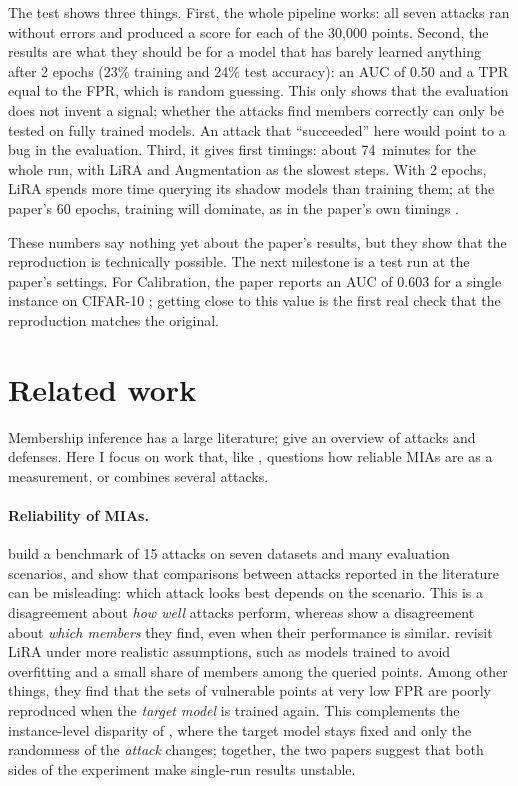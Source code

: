 \documentclass[a4paper]{article}
\begin{document}
The test shows three things.
First, the whole pipeline works: all seven attacks ran without errors and produced a score for each of the 30{,}000 points.
Second, the results are what they should be for a model that has barely learned anything after 2 epochs (23\% training and 24\% test accuracy): an AUC of 0.50 and a TPR equal to the FPR, which is random guessing. This only shows that the evaluation does not invent a signal; whether the attacks find members correctly can only be tested on fully trained models.
An attack that ``succeeded'' here would point to a bug in the evaluation.
Third, it gives first timings: about 74~minutes for the whole run, with LiRA and Augmentation as the slowest steps.
With 2 epochs, LiRA spends more time querying its shadow models than training them; at the paper's 60 epochs, training will dominate, as in the paper's own timings \citep[extended version, App.~C.1]{wang2025mia}.

These numbers say nothing yet about the paper's results, but they show that the reproduction is technically possible.
The next milestone is a test run at the paper's settings.
For Calibration, the paper reports an AUC of 0.603 for a single instance on CIFAR-10 \citep[Table~1]{wang2025mia}; getting close to this value is the first real check that the reproduction matches the original.

\section{Related work}
\label{sec:relwork}

Membership inference has a large literature; \citet{hu2022survey} give an overview of attacks and defenses.
Here I focus on work that, like \citet{wang2025mia}, questions how reliable MIAs are as a measurement, or combines several attacks.

\paragraph{Reliability of MIAs.}
\citet{niu2025comparing} build a benchmark of 15 attacks on seven datasets and many evaluation scenarios, and show that comparisons between attacks reported in the literature can be misleading: which attack looks best depends on the scenario.
This is a disagreement about \emph{how well} attacks perform, whereas \citet{wang2025mia} show a disagreement about \emph{which members} they find, even when their performance is similar.
\citet{jebreel2026revisiting} revisit LiRA under more realistic assumptions, such as models trained to avoid overfitting and a small share of members among the queried points.
Among other things, they find that the sets of vulnerable points at very low FPR are poorly reproduced when the \emph{target model} is trained again.
This complements the instance-level disparity of \citet{wang2025mia}, where the target model stays fixed and only the randomness of the \emph{attack} changes; together, the two papers suggest that both sides of the experiment make single-run results unstable.
\end{document}
